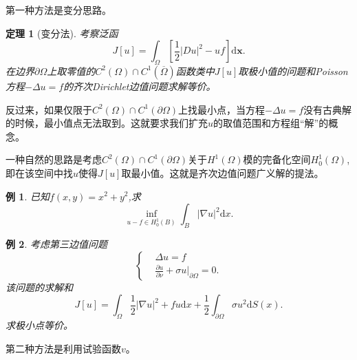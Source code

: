 \documentclass[a4paper]{ctexart}
\newtheorem{Example}{\hspace{2em}例}[section]
\newtheorem{Thm}{\hspace{2em}定理}[section]
\newcommand{\dif}{\mathrm{d}}
\newcommand{\pdfFrac}[2]{\frac{\partial #1}{\partial #2}}
\begin{document}
第一种方法是变分思路。
\begin{Thm}[变分法]
    考察泛函
    \begin{equation}
        J[u]=\int_{\Omega}\left[\frac{1}{2}|Du|^{2}-uf\right]\dif\mathbf{x}.
    \end{equation}
    在边界$\partial\Omega$上取零值的$C^{2}(\Omega)\cap C^{1}(\overline{\Omega})$函数类中$J[u]$取极小值的问题和Poisson方程$-\varDelta u=f$的齐次Dirichlet边值问题求解等价。
\end{Thm}

反过来，如果仅限于$C^{2}(\Omega)\cap C^{1}(\partial\Omega)$上找最小点，当方程$-\varDelta u=f$没有古典解的时候，最小值点无法取到。这就要求我们扩充$u$的取值范围和方程组“解”的概念。

一种自然的思路是考虑$C^{2}(\Omega)\cap C^{1}(\partial\Omega)$关于$H^{1}(\Omega)$模的完备化空间$H_{0}^{1}(\Omega)$,即在该空间中找$u$使得$J[u]$取最小值。这就是齐次边值问题广义解的提法。
\begin{Example}
    已知$f(x,y)=x^2+y^2$,求
    \begin{equation}
        \inf_{u-f\in H_{0}^{1}(B)}\int_{B}|\nabla u|^{2}\dif x.
    \end{equation}
\end{Example}
\begin{Example}
    考虑第三边值问题
    \begin{equation}
        \left\{
            \begin{aligned}
            &\varDelta u=f\\
            &\pdfFrac{u}{\nu}+\sigma u|_{\partial\Omega}=0.
            \end{aligned}
        \right.
    \end{equation}
    该问题的求解和
    \begin{equation}
        J[u]=\int_{\Omega}\frac{1}{2}|\nabla u|^{2}+fu\dif x+\frac{1}{2}\int_{\partial\Omega}\sigma u^{2}\dif S(x).
    \end{equation}
    求极小点等价。
\end{Example}
第二种方法是利用试验函数$v$。
\end{document}

